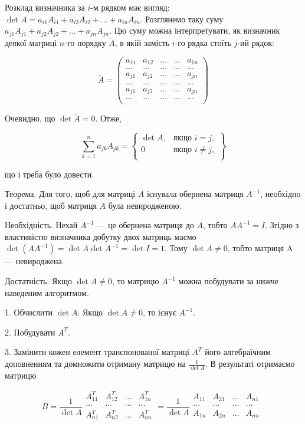 Розклад визначника за $i$-м рядком має вигляд: $\det A = a_{i1} A_{i1} + a_{i2} A_{i2} + ... + a_{in} A_{in}$.
Розглянемо таку суму $a_{j1} A_{j1} + a_{j2} A_{j2} + ... + a_{jn} A_{jn}$. Цю суму можна
інтерпретувати, як визначник деякої матриці $n$-го порядку $\tilde{A}$, в якій замість $i$-го
рядка стоїть $j$-ий рядок:

$$\tilde{A} = \begin{pmatrix}
	a_{11} & a_{12} & ... & ... & a_{1n} \\
	...    & ...    & ... & ... & ...    \\
	a_{j1} & a_{j2} & ... & ... & a_{jn} \\
	...    & ...    & ... & ... & ...    \\
	a_{j1} & a_{j2} & ... & ... & a_{jn} \\ 
	...    & ...    & ... & ... & ...    \\
\end{pmatrix}$$


Очевидно, що $\det \tilde{A} = 0$. Отже,

$$\sum\limits_{k=1}^n a_{jk} A_{jk} = \left\{ \begin{matrix}
	\det A, & \text{якщо } i = j,    \\
	0       & \text{якщо } i \neq j, \\
\end{matrix} \right\} $$

що і треба було довести.



Теорема. Для того, щоб для матриці $A$ існувала обернена матриця $A^{-1}$,
необхідно і достатньо, щоб матриця $A$ була невиродженою.


Необхідність. Нехай $A^{-1}$ --- це обернена матриця до $A$, тобто $A A^{-1} = I$. Згідно
з властивістю визначника добутку двох матриць маємо
$\det(A A^{-1}) = \det A \det A^{-1} = \det I = 1$. Тому $\det A \neq 0$, тобто матриця A ---
невироджена. 


Достатність. Якщо $\det A \neq 0$, то матрицю $A^{-1}$ можна побудувати за нижче
наведеним алгоритмом.

1. Обчислити $\det A$. Якщо $\det A \neq 0$, то існує $A^{-1}$.

2. Побудувати $A^T$.

3. Замінити кожен елемент транспонованої матриці $A^T$ його алгебраїчним
доповненням та домножити отриману матрицю на $\frac{1}{\det A}$. В результаті отримаємо
матрицю

$$B = \dfrac{1}{\det A} \begin{matrix}
	A_{11}^T & A_{12}^T & ... & A_{1n}^T \\
	...      & ...      & ... & ...      \\
	A_{n1}^T & A_{n2}^T & ... & A_{nn}^T \\
\end{matrix} = \dfrac{1}{\det A} \begin{matrix}
	A_{11} & A_{21} & ... & A_{n1} \\
	...    & ...    & ... & ...    \\
	A_{1n} & A_{2n} & ... & A_{nn} \\
\end{matrix}.$$



